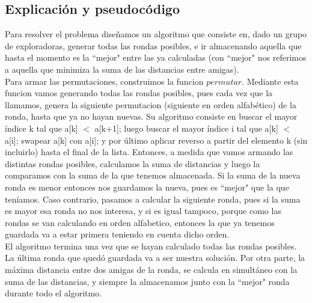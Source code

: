 \subsection{Explicación y pseudocódigo}
Para resolver el problema diseñamos un algoritmo que consiste en, dado un grupo de exploradoras, generar todas las rondas 
posibles, e ir almacenando aquella que hasta el momento es la ``mejor"$ $ entre las ya calculadas (con ``mejor"$ $ nos referimos a 
aquella que minimiza la suma de las distancias entre amigas).\\

Para armar las permutaciones, construimos la funcion $permutar$. Mediante esta funcion vamos generando todas las rondas posibles, 
pues cada vez que la llamamos, genera la siguiente permutacion (siguiente en orden alfabético) de la ronda, hasta que ya no hayan 
nuevas. Su algoritmo consiste en buscar el mayor índice k tal que a[k] $<$ a[k+1]; luego buscar el mayor índice i tal que a[k] $<
$ a[i]; swapear a[k] con a[i]; y por último aplicar reverso a partir del elemento k (sin incluirlo) hasta el final de la lista. Entonces, a medida 
que vamos armando las distintas rondas posibles, calculamos la suma de distancias y luego la comparamos con la suma de la que 
tenemos almacenada. Si la suma de la nueva ronda es menor entonces nos guardamos la nueva, pues es ``mejor"$ $ que la que 
teníamos. Caso contrario, pasamos a calcular la siguiente ronda, pues si la suma es mayor esa ronda no nos interesa, y si es igual 
tampoco, porque como las rondas se van calculando en orden alfabetico, entonces la que ya tenemos guardada va a estar primera 
teniendo en cuenta dicho orden. \\

El algoritmo termina una vez que se hayan calculado todas las rondas posibles. La última ronda que quedó guardada va a ser nuestra 
solución. Por otra parte, la máxima distancia entre dos amigas de la ronda, se calcula en simultáneo con la suma de las distancias, y 
siempre la almacenamos junto con la ``mejor"$ $ ronda durante todo el algoritmo. \\

